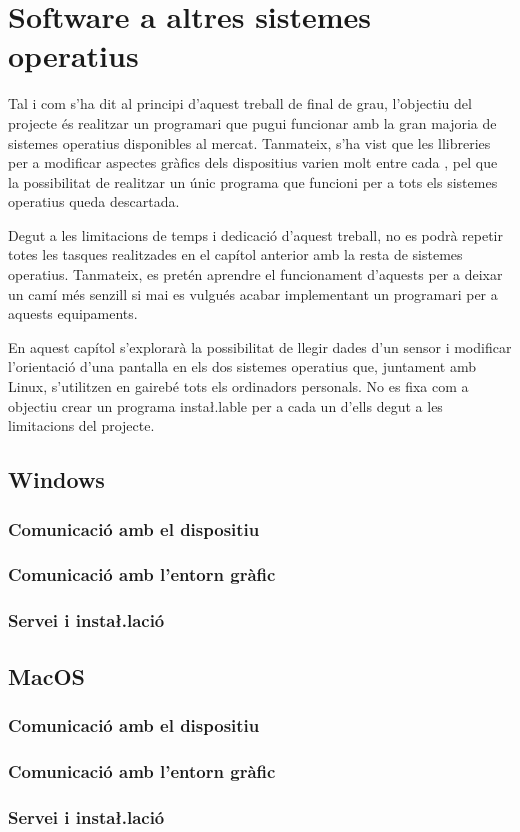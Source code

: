\chapter{Software a altres sistemes operatius}

Tal i com s'ha dit al principi d'aquest treball de final de grau, l'objectiu
del projecte és realitzar un programari que pugui funcionar amb la gran majoria
de sistemes operatius disponibles al mercat. Tanmateix, s'ha vist que les
llibreries per a modificar aspectes gràfics dels dispositius varien molt entre
cada , pel que la possibilitat de realitzar un únic programa que
funcioni per a tots els sistemes operatius queda descartada.

Degut a les limitacions de temps i dedicació d'aquest treball, no es podrà
repetir totes les tasques realitzades en el capítol anterior amb la resta
de sistemes operatius. Tanmateix, es pretén aprendre el funcionament d'aquests
per a deixar un camí més senzill si mai es vulgués acabar implementant un
programari per a aquests equipaments.

En aquest capítol s'explorarà la possibilitat de llegir dades d'un sensor
 i modificar l'orientació d'una pantalla en els dos sistemes operatius
que, juntament amb Linux, s'utilitzen en gairebé tots els ordinadors personals.
No es fixa com a objectiu crear un programa insta\l.lable per a cada un d'ells
degut a les limitacions del projecte.

\section{Windows}
\subsection{Comunicació amb el dispositiu}
\subsection{Comunicació amb l'entorn gràfic}
\subsection{Servei i insta\l.lació}

\section{MacOS}
\subsection{Comunicació amb el dispositiu}
\subsection{Comunicació amb l'entorn gràfic}
\subsection{Servei i insta\l.lació}

